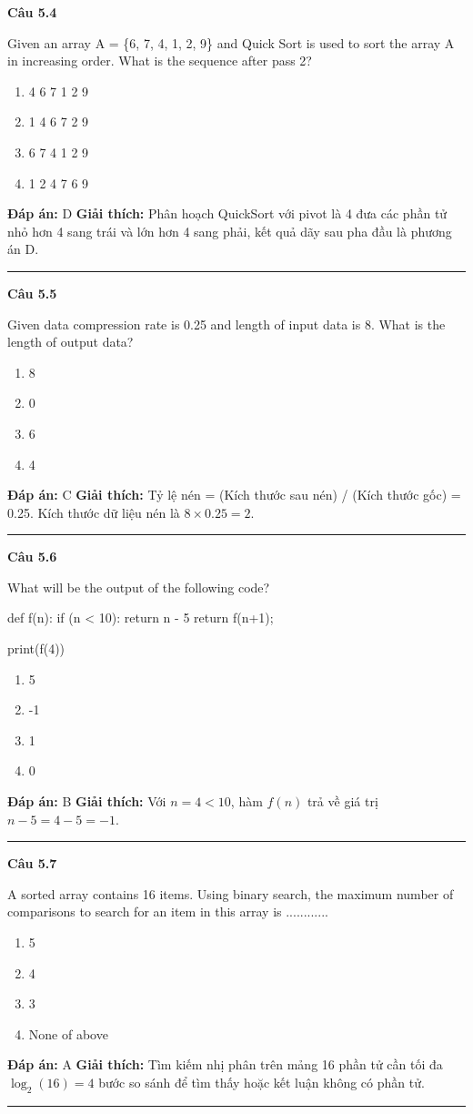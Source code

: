 \documentclass[11pt,a4paper]{article}
\newenvironment{question}[1]{%
  \par\vspace{1em}\noindent\textbf{\large Câu #1}\par\vspace{0.4em}
}{%
  \par\vspace{1em}\hrule\vspace{0.6em}
}
\newenvironment{choices}{%
  \begin{enumerate}[label=\textbf{\Alph*.},leftmargin=2.2em,itemsep=2pt,topsep=3pt]
}{%
  \end{enumerate}
}
\newcommand{\choice}{\item}
\newenvironment{codebox}{%
  \begin{tcolorbox}[colback=gray!8!white,colframe=gray!50!black,arc=1.5mm,boxrule=0.6pt,left=3mm,right=3mm,top=2.5mm,bottom=2.5mm]
  \ttfamily\small
}{%
  \end{tcolorbox}
}
\begin{document}
\begin{question}{5.4}
Given an array A = \{6, 7, 4, 1, 2, 9\} and Quick Sort is used to sort the array A in increasing order. What is the sequence after pass 2?
\begin{choices}
\choice 4 6 7 1 2 9
\choice 1 4 6 7 2 9
\choice 6 7 4 1 2 9
\choice 1 2 4 7 6 9
\end{choices}
\textbf{Đáp án:} D
\textbf{Giải thích:} Phân hoạch QuickSort với pivot là 4 đưa các phần tử nhỏ hơn 4 sang trái và lớn hơn 4 sang phải, kết quả dãy sau pha đầu là phương án D.
\end{question}

\begin{question}{5.5}
Given data compression rate is 0.25 and length of input data is 8. What is the length of output data?
\begin{choices}
\choice 8
\choice 0
\choice 6
\choice 4
\end{choices}
\textbf{Đáp án:} C
\textbf{Giải thích:} Tỷ lệ nén = (Kích thước sau nén) / (Kích thước gốc) = 0.25. Kích thước dữ liệu nén là $8 \times 0.25 = 2$.
\end{question}

\begin{question}{5.6}
What will be the output of the following code?
\begin{codebox}
def f(n):
    if (n < 10):
        return n - 5
    return f(n+1);

print(f(4))
\end{codebox}
\begin{choices}
\choice 5
\choice -1
\choice 1
\choice 0
\end{choices}
\textbf{Đáp án:} B
\textbf{Giải thích:} Với $n = 4 < 10$, hàm $f(n)$ trả về giá trị $n - 5 = 4 - 5 = -1$.
\end{question}

\begin{question}{5.7}
A sorted array contains 16 items. Using binary search, the maximum number of comparisons to search for an item in this array is ............
\begin{choices}
\choice 5
\choice 4
\choice 3
\choice None of above
\end{choices}
\textbf{Đáp án:} A
\textbf{Giải thích:} Tìm kiếm nhị phân trên mảng 16 phần tử cần tối đa $\log_2(16) = 4$ bước so sánh để tìm thấy hoặc kết luận không có phần tử.
\end{question}
\end{document}
